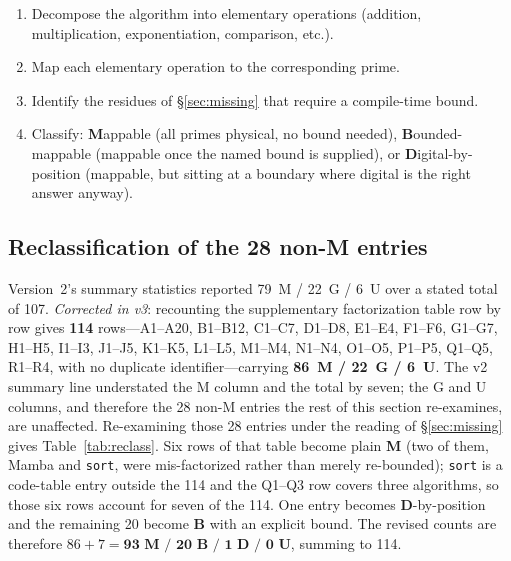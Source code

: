 \documentclass[11pt]{article}
\begin{document}
\begin{enumerate}[leftmargin=*]
\item Decompose the algorithm into elementary operations (addition, multiplication, exponentiation, comparison, etc.).
\item Map each elementary operation to the corresponding prime.
\item Identify the residues of \S\ref{sec:missing} that require a compile-time bound.
\item Classify: \textbf{M}appable (all primes physical, no bound needed), \textbf{B}ounded-mappable (mappable once the named bound is supplied), or \textbf{D}igital-by-position (mappable, but sitting at a boundary where digital is the right answer anyway).
\end{enumerate}

\subsection{Reclassification of the 28 non-M entries}
\label{sec:reclass}

Version~2's summary statistics reported 79~M / 22~G / 6~U over a stated total of 107. \textit{Corrected in v3}: recounting the supplementary factorization table row by row gives \textbf{114} rows---A1--A20, B1--B12, C1--C7, D1--D8, E1--E4, F1--F6, G1--G7, H1--H5, I1--I3, J1--J5, K1--K5, L1--L5, M1--M4, N1--N4, O1--O5, P1--P5, Q1--Q5, R1--R4, with no duplicate identifier---carrying \textbf{86~M / 22~G / 6~U}. The v2 summary line understated the M column and the total by seven; the G and U columns, and therefore the 28 non-M entries the rest of this section re-examines, are unaffected. Re-examining those 28 entries under the reading of \S\ref{sec:missing} gives Table~\ref{tab:reclass}. Six rows of that table become plain \textbf{M} (two of them, Mamba and \texttt{sort}, were mis-factorized rather than merely re-bounded); \texttt{sort} is a code-table entry outside the 114 and the Q1--Q3 row covers three algorithms, so those six rows account for seven of the 114. One entry becomes \textbf{D}-by-position and the remaining 20 become \textbf{B} with an explicit bound. The revised counts are therefore $86 + 7 = \textbf{93~M / 20~B / 1~D / 0~U}$, summing to 114.
\end{document}

